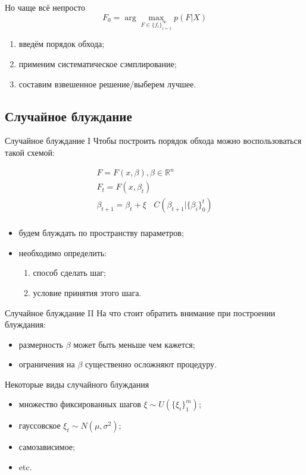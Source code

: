 \documentclass[14pt, fleqn, xcolor={dvipsnames, table}]{beamer}
\begin{document}
\begin{frame}{Но чаще всё непросто}
$$
F_0 = \arg\max_{F \in \{f_i\}_{i=1}^\infty} p(F|X)
$$
\begin{enumerate}
  \item введём порядок обхода;
  \item применим систематическое сэмплирование;
  \item составим взвешенное решение/выберем лучшее.
\end{enumerate}
\end{frame}

\subsection{Случайное блуждание}
\begin{frame}{Случайное блуждание I}
Чтобы построить порядок обхода можно воспользоваться такой схемой:

$$\begin{array}{l}
F = F(x, \beta), \beta \in \mathbb{R}^n \\
F_t = F(x, \beta_t) \\
\beta_{t+1} = \beta_t + \xi~~~~C(\beta_{t+1} | \{\beta_i\}_0^t) \\
\end{array}$$

\begin{itemize}
  \item будем блуждать по пространству параметров;
  \item необходимо определить:
  \begin{enumerate}
    \item способ сделать шаг;
    \item условие принятия этого шага.
  \end{enumerate}
\end{itemize}
\end{frame}

\begin{frame}{Случайное блуждание II}
На что стоит обратить внимание при построении блуждания:
\begin{itemize}
  \item размерность $\beta$ может быть меньше чем кажется;
  \item ограничения на $\beta$ существенно осложняют процедуру.
\end{itemize}
\end{frame}


\begin{frame}{Некоторые виды случайного блуждания}
\begin{itemize}
  \item множество фиксированных шагов $\xi \sim U(\{\xi_i\}_1^m)$;
  \item гауссовское $\xi_t \sim N(\mu, \sigma^2)$;
  \item самозависимое;
  \item etc.
\end{itemize}
\end{frame}
\end{document}
